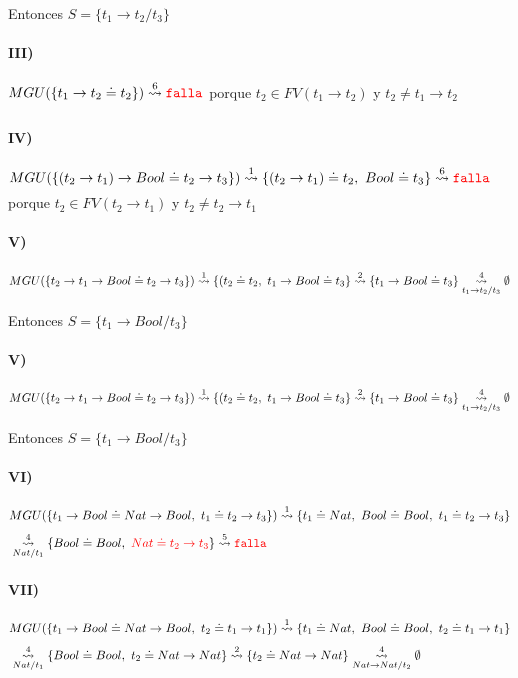 \documentclass[10pt,a4paper]{article}
\begin{document}
Entonces $S = \{t_1\to t_2/t_3\}$

\paragraph{III)}$MGU(\{t_1\to t_2\doteq t_2\}) \goesTo{6}{} \falla$ porque $t_2\in FV(t_1\to t_2)$ y $t_2\neq t_1\to t_2$

\paragraph{IV)}$MGU(\{(t_2\to t_1)\to Bool\doteq t_2\to t_3\}) \goesTo{1}{} \{(t_2\to t_1)\doteq t_2,~ Bool\doteq t_3\} \goesTo{6}{} \falla$ porque $t_2\in FV(t_2\to t_1)$ y $t_2\neq t_2\to t_1$

\paragraph{V)}$MGU(\{t_2\to t_1\to Bool\doteq t_2\to t_3\}) \goesTo{1}{} \{(t_2\doteq t_2,~ t_1\to Bool\doteq t_3\} \goesTo{2}{} \{t_1\to Bool\doteq t_3\} \goesTo{4}{t_1\to t_2/t_3} \emptyset$

Entonces $S = \{t_1\to Bool/t_3\}$

\paragraph{V)}$MGU(\{t_2\to t_1\to Bool\doteq t_2\to t_3\}) \goesTo{1}{} \{(t_2\doteq t_2,~ t_1\to Bool\doteq t_3\} \goesTo{2}{} \{t_1\to Bool\doteq t_3\} \goesTo{4}{t_1\to t_2/t_3} \emptyset$

Entonces $S = \{t_1\to Bool/t_3\}$

\paragraph{VI)}
\begin{align*}
&MGU(\{t_1\to Bool\doteq Nat\to Bool, ~t_1\doteq t_2\to t_3\}) \goesTo{1}{} \{t_1\doteq Nat,~ Bool\doteq Bool, ~t_1\doteq t_2\to t_3\} \\
&\goesTo{4}{Nat/t_1} \{Bool\doteq Bool, ~\red{Nat\doteq t_2\to t_3}\} \goesTo{5}{} \falla
\end{align*}

\paragraph{VII)}
\begin{align*}
&MGU(\{t_1\to Bool\doteq Nat\to Bool, ~t_2\doteq t_1\to t_1\}) \goesTo{1}{} \{t_1\doteq Nat,~ Bool\doteq Bool, ~t_2\doteq t_1\to t_1\} \\
&\goesTo{4}{Nat/t_1} \{Bool\doteq Bool, ~t_2\doteq Nat\to Nat\} \goesTo{2}{} \{t_2\doteq Nat\to Nat\} \goesTo{4}{Nat\to Nat/t_2} \emptyset
\end{align*}
\end{document}
